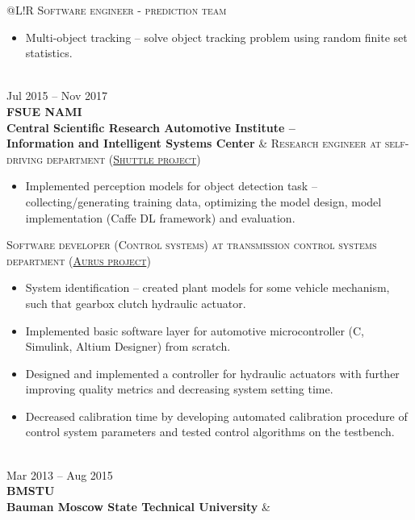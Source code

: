 \documentclass[10pt, a4paper]{extarticle}
\newcommand\boldgrey[1]{\textcolor{mygray}{\textbf{#1}}}
\newcommand\VRule{\color{lightgray}\vrule width 0.5pt}
\begin{document}
\begin{tabular}{@{}L!{\VRule}R}
    \textsc{Software engineer - prediction team}
    \begin{itemize}
        \item Multi-object tracking -- solve object tracking problem using random finite set statistics.
    \end{itemize}                                                                                                  \\
    Jul 2015 -- Nov 2017                                                                                                       \\ {\bf FSUE NAMI} \\ \boldgrey{Central Scientific Research Automotive Institute -- \\ Information and Intelligent Systems Center} &
    {\textsc{Research engineer at self-driving department (\href{https://www.engadget.com/2016/08/28/yandex-teams-on-self-driving-shuttle-bus/}{Shuttle project})}}
    \begin{itemize}
        \item Implemented perception models for object detection task -- collecting/generating training data, optimizing the model design, model implementation (Caffe DL framework) and evaluation.
    \end{itemize}
    \textsc{Software developer (Control systems) at transmission control systems department (\href{https://en.wikipedia.org/wiki/Aurus_Senat}{Aurus project})}
    \begin{itemize}
        \item System identification -- created plant models for some vehicle mechanism, such that gearbox clutch hydraulic actuator.
        \item Implemented basic software layer for automotive microcontroller (C, Simulink, Altium Designer) from scratch.
        \item Designed and implemented a controller for hydraulic actuators with further improving quality metrics and decreasing system setting time.
        \item Decreased calibration time by developing automated calibration procedure of control system parameters and tested control algorithms on the testbench.
    \end{itemize}                                                                                                  \\
    Mar 2013 -- Aug 2015                                                                                                       \\ {\bf BMSTU \\ \boldgrey{Bauman Moscow State Technical University}} &

\end{tabular}
\end{document}
